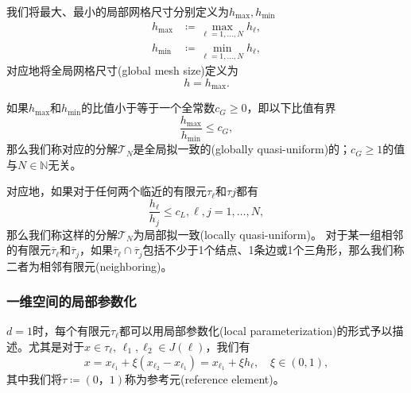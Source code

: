 我们将最大、最小的局部网格尺寸分别定义为$h_{\max},h_{\min}$
\begin{equation*}
  \begin{split}
    h_{\max} & \coloneqq \max_{\ell =1,\ldots,N} h_{\ell}, \\
    h_{\min} & \coloneqq \min_{\ell =1,\ldots,N} h_{\ell},
  \end{split}
\end{equation*}
对应地将全局网格尺寸(global mesh size)定义为
\begin{equation*}
  h = h_{\max}.
\end{equation*}

如果$h_{\max}$和$h_{\min}$的比值小于等于一个全常数$c_{G} \ge 0$，即以下比值有界
\begin{equation*}
  \frac{h_{\max}}{h_{\min}} \le c_{G},
\end{equation*}
那么我们称对应的分解$\mathcal{T}_{N}$是全局拟一致的(globally quasi-uniform)的；$c_{G} \ge 1$的值与$N \in \mathbb{N}$无关。

对应地，如果对于任何两个临近的有限元$\tau_{\ell}$和$\tau{j}$都有
\begin{equation*}
  \frac{h_{\ell}}{h_{j}} \le c_{L}, \ell,j = 1,\ldots,N,
\end{equation*}
那么我们称这样的分解$\mathcal{T}_{N}$为局部拟一致(locally quasi-uniform)。
对于某一组相邻的有限元$\overline{\tau}_{\ell}$和$\overline{\tau}_{j}$，如果$\overline{\tau}_{\ell} \cap \overline{\tau}_{j}$包括不少于1个结点、1条边或1个三角形，那么我们称二者为相邻有限元(neighboring)。

\subsubsection{一维空间的局部参数化}
$d=1$时，每个有限元$\tau_{\ell}$都可以用局部参数化(local parameterization)的形式予以描述。尤其是对于$x \in \tau_{\ell}, \, \ell_{1}, \ell_{2} \in J(\ell)$，我们有
\begin{equation*}
  x = x_{\ell_{1}} + \xi \left( x_{\ell_{2}} - x_{\ell_{1}} \right)
  =x_{\ell_{1}} + \xi h_{\ell}, \quad \xi \in (0,1),
\end{equation*}
其中我们将$\tau \coloneqq (0，1)$称为参考元(reference element)。

